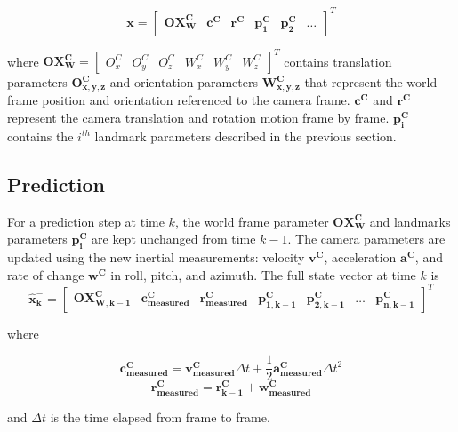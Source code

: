 \begin{equation}
\boldsymbol{x}=\begin{bmatrix}
\boldsymbol{OX_{W}^{C}} & \boldsymbol{c^{C}} & \boldsymbol{r^{C}} & 
\boldsymbol{p_{1}^{C}} & \boldsymbol{p_{2}^{C}} & \ldots 
\end{bmatrix}^T
\end{equation}

\noindent where $\boldsymbol{OX_{W}^{C}}= \begin{bmatrix}O_{x}^{C} &
  O_{y}^{C} & O_{z}^{C} & W_{x}^{C} & W_{y}^{C} &
  W_{z}^{C} \end{bmatrix}^{T}$ contains translation parameters
$\boldsymbol{O_{x,y,z}^{C}}$ and orientation parameters
$\boldsymbol{W_{x,y,z}^{C}}$ that represent the world frame position and
orientation referenced to the camera frame.
$\boldsymbol{c^{C}}$ and $\boldsymbol{r^{C}}$ represent the camera
translation and rotation motion frame by frame. $\boldsymbol{p_{i}^{C}}$
contains the $i^{th}$ landmark parameters described in the previous section.

\subsection{Prediction}

For a prediction step at time $k$, the world frame parameter
$\boldsymbol{OX_W^C}$ and landmarks parameters $\boldsymbol{p_i^C}$ are kept
unchanged from time $k-1$. The camera parameters are updated using the
new inertial measurements: velocity $\boldsymbol{v^{C}}$, acceleration
$\boldsymbol{a^{C}}$, and rate of change $\boldsymbol{w^{C}}$ in roll, pitch, and
azimuth. The full state vector at time $k$ is
\begin{equation}
\boldsymbol{\hat{x}_{k}^-}
=\begin{bmatrix}
\boldsymbol{OX_{W,k-1}^{C}} & 
\boldsymbol{c_{measured}^{C}} &
\boldsymbol{r_{measured}^{C}} & 
\boldsymbol{p_{1,k-1}^{C}} & 
\boldsymbol{p_{2,k-1}^{C}} & 
\ldots & 
\boldsymbol{p_{n,k-1}^C}
\end{bmatrix}^T
\end{equation}

\noindent where 

$$\boldsymbol{c_{measured}^{C}}=\boldsymbol{v_{measured}^{C}}\Delta t+ 
\frac{1}{2}\boldsymbol{a_{measured}^{C}}\Delta t^{2}$$
$$\boldsymbol{r_{measured}^{C}}=\boldsymbol{r_{k-1}^{C}}+ \boldsymbol{w_{measured}^{C}}$$

\noindent and $\Delta t$ is the time elapsed from frame to frame. 

